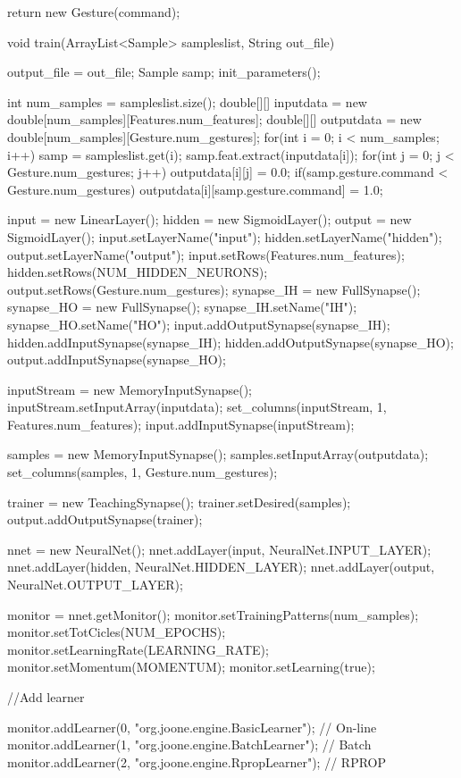 \documentclass[12pt,a4,notitlepage]{report}
\renewcommand{\_}{\texttt{\symbol{95}}}
\newcommand{\<}{\texttt{\symbol{60}}}
\renewcommand{\>}{\texttt{\symbol{62}}}
\begin{document}
\begin{code}
{{		return new Gesture(command);

	}
		
	void train(ArrayList<Sample> sampleslist, String out_file)
	{

		output_file = out_file;
		Sample samp;
		init_parameters();
		
		int num_samples = sampleslist.size();
		double[][] inputdata = new double[num_samples][Features.num_features];
		double[][] outputdata = new double[num_samples][Gesture.num_gestures];
		for(int i = 0; i < num_samples; i++)
		{
			samp = sampleslist.get(i);
			samp.feat.extract(inputdata[i]);
			for(int j = 0; j < Gesture.num_gestures; j++)
				outputdata[i][j] = 0.0;
			if(samp.gesture.command < Gesture.num_gestures)
				outputdata[i][samp.gesture.command] = 1.0;
		}
		
		input = new LinearLayer();
		hidden = new SigmoidLayer();
		output = new SigmoidLayer();
		input.setLayerName("input");
		hidden.setLayerName("hidden");
		output.setLayerName("output");
		input.setRows(Features.num_features);
		hidden.setRows(NUM_HIDDEN_NEURONS);
		output.setRows(Gesture.num_gestures);
		synapse_IH = new FullSynapse();
		synapse_HO = new FullSynapse();
		synapse_IH.setName("IH");
		synapse_HO.setName("HO");
		input.addOutputSynapse(synapse_IH);
		hidden.addInputSynapse(synapse_IH);
		hidden.addOutputSynapse(synapse_HO);
		output.addInputSynapse(synapse_HO);
		
		inputStream = new MemoryInputSynapse();
		inputStream.setInputArray(inputdata);
		set_columns(inputStream, 1, Features.num_features);
		input.addInputSynapse(inputStream);

		samples = new MemoryInputSynapse();
		samples.setInputArray(outputdata);
		set_columns(samples, 1, Gesture.num_gestures);
			
		trainer = new TeachingSynapse();
		trainer.setDesired(samples);
		output.addOutputSynapse(trainer);
			
		nnet = new NeuralNet();
		nnet.addLayer(input, NeuralNet.INPUT_LAYER);
		nnet.addLayer(hidden, NeuralNet.HIDDEN_LAYER);
		nnet.addLayer(output, NeuralNet.OUTPUT_LAYER);
		
		monitor = nnet.getMonitor();
		monitor.setTrainingPatterns(num_samples);
		monitor.setTotCicles(NUM_EPOCHS);
		monitor.setLearningRate(LEARNING_RATE);
		monitor.setMomentum(MOMENTUM);
		monitor.setLearning(true);
		
		//Add learner
		
		monitor.addLearner(0, "org.joone.engine.BasicLearner"); // On-line
		monitor.addLearner(1, "org.joone.engine.BatchLearner"); // Batch
		monitor.addLearner(2, "org.joone.engine.RpropLearner"); // RPROP
		
}}
\end{code}
\end{document}
